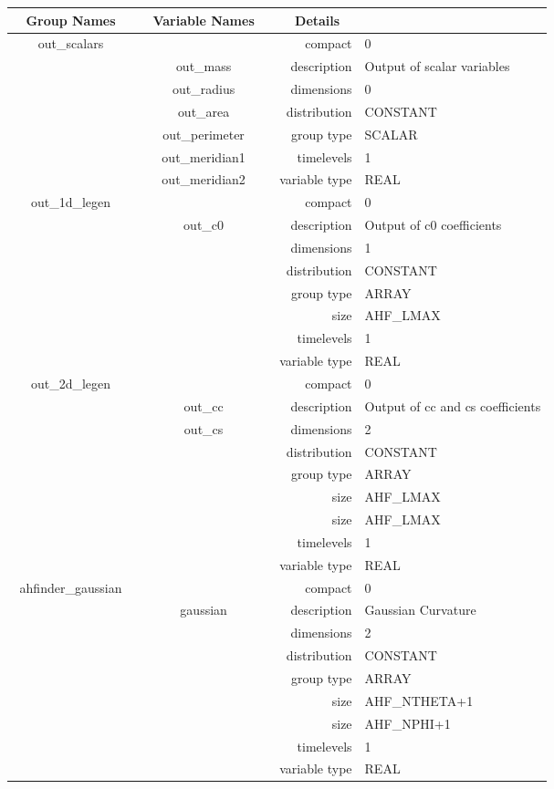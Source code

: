 \begin{tabular*}{150mm}{|c|c@{\extracolsep{\fill}}|rl|} \hline 
~ {\bf Group Names} ~ & ~ {\bf Variable Names} ~  &{\bf Details} ~ & ~ \\ 
\hline 
out\_scalars &  & compact & 0 \\ 
 & out\_mass & description & Output of scalar variables \\ 
 & out\_radius & dimensions & 0 \\ 
 & out\_area & distribution & CONSTANT \\ 
 & out\_perimeter & group type & SCALAR \\ 
 & out\_meridian1 & timelevels & 1 \\ 
 & out\_meridian2 & variable type & REAL \\ 
\hline 
out\_1d\_legen &  & compact & 0 \\ 
 & out\_c0 & description & Output of c0 coefficients \\ 
 &  & dimensions & 1 \\ 
 &  & distribution & CONSTANT \\ 
 &  & group type & ARRAY \\ 
 &  & size & AHF\_LMAX \\ 
 &  & timelevels & 1 \\ 
 &  & variable type & REAL \\ 
\hline 
out\_2d\_legen &  & compact & 0 \\ 
 & out\_cc & description & Output of cc and cs coefficients \\ 
 & out\_cs & dimensions & 2 \\ 
 &  & distribution & CONSTANT \\ 
 &  & group type & ARRAY \\ 
 &  & size & AHF\_LMAX \\ 
& ~ & size & AHF\_LMAX \\ 
 &  & timelevels & 1 \\ 
 &  & variable type & REAL \\ 
\hline 
ahfinder\_gaussian &  & compact & 0 \\ 
 & gaussian & description & Gaussian Curvature \\ 
 &  & dimensions & 2 \\ 
 &  & distribution & CONSTANT \\ 
 &  & group type & ARRAY \\ 
 &  & size & AHF\_NTHETA+1 \\ 
& ~ & size & AHF\_NPHI+1 \\ 
 &  & timelevels & 1 \\ 
 &  & variable type & REAL \\ 
\hline 
\end{tabular*} 


